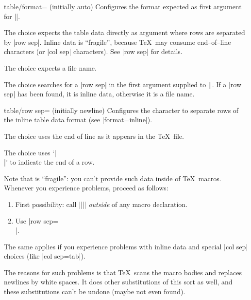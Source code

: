 \begin{pgfplotskey}{table/format= (initially auto)}
	Configures the format expected as first argument for |\pgfplotstableread|.
	
	The choice  expects the table data directly as argument where rows are separated by |row sep|. Inline data is ``fragile'', because \TeX\ may consume end--of--line characters (or |col sep| characters). See |row sep| for details.

	The choice  expects a file name.

	The choice  searches for a |row sep| in the first argument supplied to |\pgfplotstableread|. If a |row sep| has been found, it is inline data, otherwise it is a file name.
\end{pgfplotskey}
\begin{pgfplotskey}{table/row sep= (initially newline)}
	Configures the character to separate rows of the inline table data format (see |format=inline|).

	The choice  uses the end of line as it appears in the \TeX\ file.

	The choice \declaretext{\string\\} uses `|\\|' to indicate the end of a row.

	Note that  is ``fragile'': you can't provide such data inside of \TeX\ macros. Whenever you experience problems, proceed as follows:
	\begin{enumerate}
		\item First possibility: call |\pgfplotstableread||\yourmacro| \emph{outside} of any macro declaration.
		\item Use |row sep=\\|.
	\end{enumerate}
	The same applies if you experience problems with inline data and special |col sep| choices (like |col sep=tab|).

	The reasons for such problems is that \TeX\ scans the macro bodies and replaces newlines by white spaces. It does other substitutions of this sort as well, and these substitutions can't be undone (maybe not even found).
\end{pgfplotskey}

